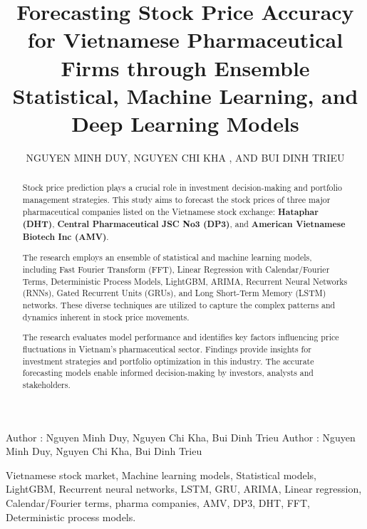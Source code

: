 \documentclass{ieeeojies}
\begin{document}
\title{Forecasting Stock Price Accuracy for Vietnamese Pharmaceutical Firms through Ensemble Statistical, Machine Learning, and Deep Learning Models}

\author{\uppercase{Nguyen Minh Duy},
\uppercase{Nguyen Chi Kha , and Bui Dinh Trieu}}

\address[1]{Faculty of Information Systems, University of Information Technology, (e-mail: 21522005@gm.uit.edu.vn)}
\address[2]{Faculty of Information Systems, University of Information Technology, (e-mail: 21522179@gm.uit.edu.vn)}
\address[3]{Faculty of Information Systems, University of Information Technology, (e-mail: 21521576@gm.uit.edu.vn)}

\markboth
{Author \headeretal: Nguyen Minh Duy, Nguyen Chi Kha, Bui Dinh Trieu}
{Author \headeretal: Nguyen Minh Duy, Nguyen Chi Kha, Bui Dinh Trieu}

\begin{abstract}
Stock price prediction plays a crucial role in investment decision-making and portfolio management strategies. This study aims to forecast the stock prices of three major pharmaceutical companies listed on the Vietnamese stock exchange: \textbf{Hataphar (DHT)}, \textbf{Central Pharmaceutical JSC No3 (DP3)}, and \textbf{American Vietnamese Biotech Inc (AMV)}.

The research employs an ensemble of statistical and machine learning models, including Fast Fourier Transform (FFT), Linear Regression with Calendar/Fourier Terms, Deterministic Process Models, LightGBM, ARIMA, Recurrent Neural Networks (RNNs), Gated Recurrent Units (GRUs), and Long Short-Term Memory (LSTM) networks. These diverse techniques are utilized to capture the complex patterns and dynamics inherent in stock price movements. 

The research evaluates model performance and identifies key factors influencing price fluctuations in Vietnam's pharmaceutical sector. Findings provide insights for investment strategies and portfolio optimization in this industry. The accurate forecasting models enable informed decision-making by investors, analysts and stakeholders. 
\end{abstract}

\begin{keywords}
Vietnamese stock market, Machine learning models, Statistical models, LightGBM, Recurrent neural networks, LSTM, GRU, ARIMA, Linear regression, Calendar/Fourier terms, pharma companies, AMV, DP3, DHT, FFT, Deterministic process models.
\end{keywords}
\end{document}
